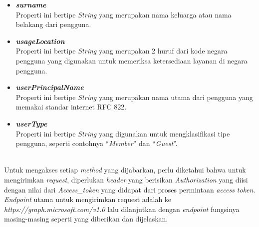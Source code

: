 \begin{itemize}
	\item \textbf{\textit{surname}}\\
	Properti ini bertipe \textit{String} yang merupakan nama keluarga atau nama belakang dari pengguna.  
	\item \textbf{\textit{usageLocation}}\\
	Properti ini bertipe \textit{String} yang merupakan 2 huruf dari kode negara pengguna yang digunakan untuk memeriksa ketersediaan layanan di negara pengguna. 
	\item \textbf{\textit{userPrincipalName}}\\
	Properti ini bertipe \textit{String} yang merupakan nama utama dari pengguna yang memakai standar internet RFC 822.
	\item \textbf{\textit{userType}}\\
	Properti ini bertipe \textit{String} yang digunakan untuk mengklasifikasi tipe pengguna, seperti contohnya ``\textit{Member}'' dan ``\textit{Guest}''.	 
\end{itemize}

\\
Untuk mengakses setiap \textit{method} yang dijabarkan, perlu diketahui bahwa untuk mengirimkan \textit{request}, diperlukan \textit{header} yang berisikan \textit{Authorization} yang diisi dengan nilai dari \textit{Access\_token} yang didapat dari proses permintaan \textit{access token}. \textit{Endpoint} utama untuk mengirimkan request adalah ke \textit{https://graph.microsoft.com/v1.0} lalu dilanjutkan dengan \textit{endpoint} fungsinya masing-masing seperti yang diberikan dan dijelaskan. 

